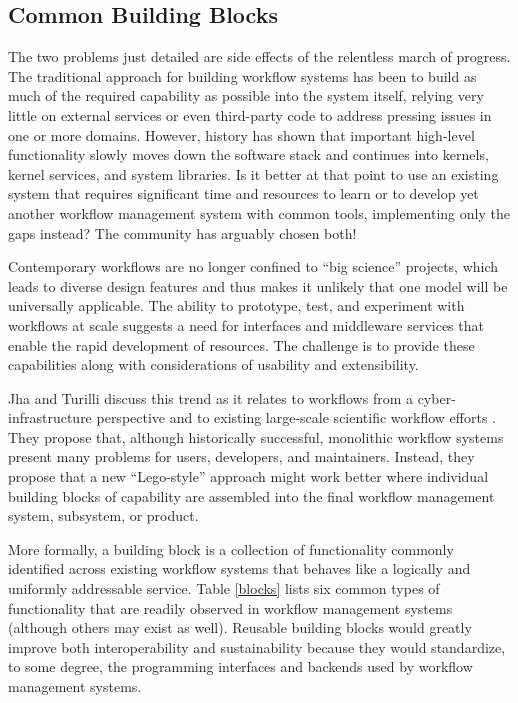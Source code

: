 \subsection{Common Building Blocks}\label{buildings-blocks}

The two problems just detailed are side effects of the relentless march of
progress. The traditional approach for building workflow systems has been to
build as much of the required capability as possible into the system itself,
relying very little on external services or even third-party code to address
pressing issues in one or more domains. However, history has shown that
important high-level functionality slowly moves down the software stack and
continues into kernels, kernel services, and system libraries. Is it better at
that point to use an existing system that requires significant time and resources
to learn or to develop yet another workflow management system with common
tools, implementing only the gaps instead? The community has arguably chosen
both!

Contemporary workflows are no longer confined to ``big science'' projects,
which leads to diverse design features and thus makes it unlikely that one
model will be universally applicable. The ability to prototype, test, and
experiment with workflows at scale suggests a need for interfaces and
middleware services that enable the rapid development of resources. The
challenge is to provide these capabilities along with considerations of
usability and extensibility.

Jha and Turilli discuss this trend as it relates to workflows from a 
cyber-infrastructure perspective and to existing large-scale scientific
workflow efforts \cite{jha_building_2016}. They propose that, although
historically successful, monolithic workflow systems present many problems for
users, developers, and maintainers. Instead, they propose that a new
``Lego-style'' approach might work better where individual building blocks of
capability are assembled into the final workflow management system, subsystem,
or product.

More formally, a building block is a collection of functionality commonly
identified across existing workflow systems that behaves like a logically and
uniformly addressable service. Table \ref{blocks} lists six common types of
functionality that are readily observed in workflow management systems
(although others may exist as well). Reusable building blocks would greatly
improve both interoperability and sustainability because they would
standardize, to some degree, the programming interfaces and backends used by
workflow management systems.

